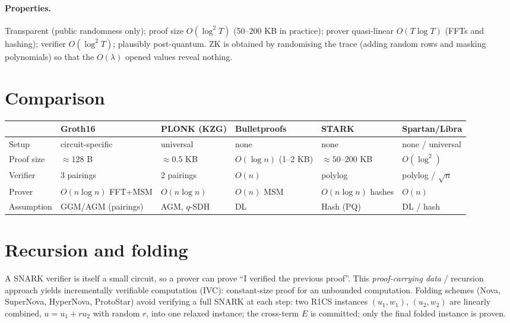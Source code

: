\documentclass[11pt,a4paper]{report}
\theoremstyle{plain}
\theoremstyle{definition}
\theoremstyle{remark}
\begin{document}
\paragraph{Properties.} Transparent (public randomness only); proof size $O(\log^2 T)$ (50--200 KB in practice); prover quasi-linear $O(T\log T)$ (FFTs and hashing); verifier $O(\log^2T)$; plausibly post-quantum. ZK is obtained by randomising the trace (adding random rows and masking polynomials) so that the $O(\lambda)$ opened values reveal nothing.

\section{Comparison}\label{sec:snarkcomp}
\begin{center}\small
\footnotesize\setlength{\tabcolsep}{4pt}\begin{tabular}{@{}L{1.9cm}L{2.2cm}L{2.0cm}L{2.5cm}L{2.2cm}L{2.1cm}@{}}\toprule
 & Groth16 & PLONK (KZG) & Bulletproofs & STARK & Spartan/Libra\\\midrule
Setup & circuit-specific & universal & none & none & none / universal\\
Proof size & $\approx 128$ B & $\approx 0.5$ KB & $O(\log n)$ (1--2 KB) & $\approx 50$--$200$ KB & $O(\log^2)$ \\
Verifier & 3 pairings & 2 pairings & $O(n)$ & polylog & polylog / $\sqrt n$\\
Prover & $O(n\log n)$ FFT+MSM & $O(n\log n)$ & $O(n)$ MSM & $O(n\log n)$ hashes & $O(n)$\\
Assumption & GGM/AGM (pairings) & AGM, $q$-SDH & DL & Hash (PQ) & DL / hash\\\bottomrule
\end{tabular}
\end{center}

\section{Recursion and folding}
A SNARK verifier is itself a small circuit, so a prover can prove ``I verified the previous proof''. This \emph{proof-carrying data} / recursion approach yields incrementally verifiable computation (IVC): constant-size proof for an unbounded computation. Folding schemes (Nova, SuperNova, HyperNova, ProtoStar) avoid verifying a full SNARK at each step: two R1CS instances $(u_1,w_1)$, $(u_2,w_2)$ are linearly combined, $u=u_1+ru_2$ with random $r$, into one relaxed instance; the cross-term $E$ is committed; only the final folded instance is proven.
\end{document}
